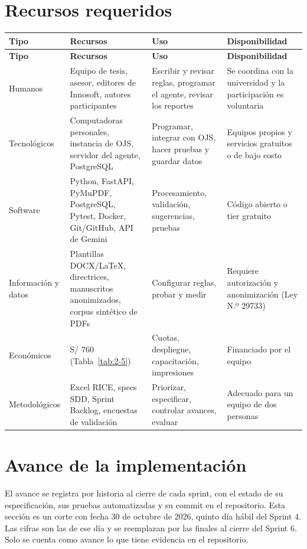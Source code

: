 \section{Recursos requeridos}

{\small
\begin{longtable}{@{}>{\raggedright\arraybackslash}p{}>{\raggedright\arraybackslash}p{}>{\raggedright\arraybackslash}p{}>{\raggedright\arraybackslash}p{}@{}}
\toprule
\textbf{Tipo} & \textbf{Recursos} & \textbf{Uso} & \textbf{Disponibilidad} \\
\midrule
\endfirsthead
\toprule
\textbf{Tipo} & \textbf{Recursos} & \textbf{Uso} & \textbf{Disponibilidad} \\
\midrule
\endhead
\bottomrule
\endfoot
\endlastfoot
Humanos & Equipo de tesis, asesor, editores de Innosoft, autores participantes & Escribir y revisar reglas, programar el agente, revisar los reportes & Se coordina con la universidad y la participación es voluntaria \\
Tecnológicos & Computadoras personales, instancia de OJS, servidor del agente, PostgreSQL & Programar, integrar con OJS, hacer pruebas y guardar datos & Equipos propios y servicios gratuitos o de bajo costo \\
Software & Python, FastAPI, PyMuPDF, PostgreSQL, Pytest, Docker, Git/GitHub, API de Gemini & Procesamiento, validación, sugerencias, pruebas & Código abierto o tier gratuito \\
Información y datos & Plantillas DOCX/LaTeX, directrices, manuscritos anonimizados, corpus sintético de PDFs & Configurar reglas, probar y medir & Requiere autorización y anonimización (Ley N.º 29733) \\
Económicos & S/ 760 (Tabla~\ref{tab:2-5}) & Cuotas, despliegue, capacitación, impresiones & Financiado por el equipo \\
Metodológicos & Excel RICE, specs SDD, Sprint Backlog, encuestas de validación & Priorizar, especificar, controlar avances, evaluar & Adecuado para un equipo de dos personas \\
\end{longtable}
}

\section{Avance de la implementación}\label{sec:avance}

El avance se registra por historia al cierre de cada sprint, con el estado de su especificación, sus pruebas automatizadas y su commit en el repositorio. Esta sección es un corte con fecha 30 de octubre de 2026, quinto día hábil del Sprint 4. Las cifras son las de ese día y se reemplazan por las finales al cierre del Sprint 6. Solo se cuenta como avance lo que tiene evidencia en el repositorio.

